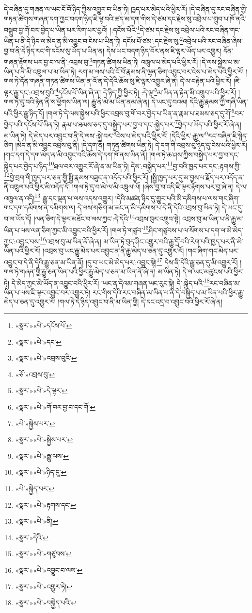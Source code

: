 དེ་བཞིན་དུ་གཞན་ལ་ཡང་ངོ་བོ་ཉིད་ཀྱིས་འགྱུར་བ་ཡིན་ཏེ། ཁྱད་པར་མེད་པའི་ཕྱིར་རོ། །དེ་བཞིན་དུ་རང་བཞིན་གྱི་གཏན་ཚིགས་གཞན་དག་ཀྱང་བདག་ཉིད་ཇི་ལྟ་བའི་ཚད་མ་དག་གིས་དེ་ཙམ་དང་རྗེས་སུ་འབྲེལ་པ་གྲུབ་པ་ཁོ་ནའི་བསྒྲུབ་བྱ་གོ་བར་བྱེད་པ་ཡིན་པར་རིག་པར་བྱའོ། །:དངོས་པོའི་\footnote{«སྣར་»«པེ་»དངོས་པོ་}དེ་ཙམ་དང་རྗེས་སུ་འབྲེལ་པའི་རང་བཞིན་གང་ཡིན་པ་ནི་དེ་ཉིད་ལ་མེད་ན་མི་འབྱུང་བ་ངེས་པ་ཡིན་ཏེ། དངོས་པོ་ཙམ་:དང་རྗེས་སུ་\footnote{«སྣར་»«པེ་»དང་}འབྲེལ་པའི་རང་བཞིན་ཞེས་བྱ་བ་ནི་དེ་ཉིད་རང་གི་དངོས་སུ་ཡོད་པ་ཡིན་ན། དེས་ཡང་བདག་ཉིད་བོར་ནས་ཇི་ལྟར་ཡོད་པར་འགྱུར། དོན་གཞན་རྟོགས་པར་བྱ་བ་ལ་ནི་:འབྲས་བུ་\footnote{«སྣར་»«པེ་»འབྲས་བུའི་}གཏན་ཚིགས་ཡིན་ཏེ། འཁྲུལ་པ་མེད་པའི་ཕྱིར་རོ། །དེ་ལས་སྐྱེས་པ་མ་ཡིན་པ་ནི་མི་འཁྲུལ་པ་མ་ཡིན་ཏེ། རག་མ་ལས་པའི་ངོ་བོ་རྣམས་ནི་ལྷན་ཅིག་འབྱུང་བར་ངེས་པ་མེད་པའི་ཕྱིར་རོ། །གལ་ཏེ་དོན་གཞན་གཏན་ཚིགས་ཡིན་ན་འོ་ན་དེ་དེའི་ཆོས་སུ་ཇི་ལྟར་འགྱུར་ཞེ་ན། དེ་ལ་བརྟེན་པའི་ཕྱིར་རོ། །ཇི་ལྟར་རྒྱུ་དང་:འབྲས་བུའི་\footnote{«ཅོ་»འབྲས་བུ་}དངོས་པོ་ཡིན་ཞེ་ན། དེ་ཉིད་ཀྱི་ཕྱིར་ཏེ། :དེ་ལྟ་\footnote{«སྣར་»«པེ་»དེ་ལྟར་}མ་ཡིན་ན་རྟེན་མི་འགྲུབ་པའི་ཕྱིར་རོ། །གལ་ཏེ་དུ་བའི་རྟེན་ནི་ས་ཕྱོགས་ཡིན་ལ། རྒྱུ་ནི་མེ་མ་ཡིན་ནམ་ཞེ་ན། དེ་ཡང་དུ་བའམ། དེའི་རྒྱུ་རྣམས་ཀྱི་གཞི་ཡིན་པའི་ཕྱིར་རྒྱུ་ཉིད་དོ། །གལ་ཏེ་དེ་ལས་སྐྱེས་པའི་ཕྱིར་འབྲས་བུ་གོ་བར་བྱེད་པ་ཡིན་ན་རྣམ་པ་ཐམས་ཅད་དུ་གོ་\footnote{«སྣར་»«པེ་»གོ་བར་བྱ་བ་དང་གོ་}བར་བྱེད་པའི་དངོས་པོ་ཡིན་ཏེ། རྣམ་པ་ཐམས་ཅད་དུ་བསྐྱེད་པར་བྱ་བ་དང་:སྐྱེད་པར་\footnote{«པེ་»སྐྱེས་པར་}བྱེད་པ་ཡོད་པའི་ཕྱིར་རོ་ཞེ་ན། མ་ཡིན་ཏེ། དེ་མེད་པར་འབྱུང་བ་ནི་དེ་ལས་:སྐྱེ་བར་\footnote{«སྣར་»«པེ་»སྐྱེས་པར་}ངེས་པ་མེད་པའི་ཕྱིར་རོ། །དེའི་ཕྱིར་:རྒྱུ་ལ་\footnote{«སྣར་»«པེ་»རྒྱུ་ལས་}རང་བཞིན་ཇི་སྙེད་ཅིག །མེད་ན་མི་འབྱུང་འབྲས་བུ་ནི། །དེ་དག་ནི། གཏན་ཚིགས་ཡིན་ཏེ། དེ་དག་གི་འབྲས་བུ་ཉིད་དུ་ངེས་པའི་ཕྱིར་རོ། །གང་དག་དེ་དག་མེད་ན་མི་འབྱུང་བའི་ཆོས་དེ་དག་ཁོ་ནས་ཡིན་ནོ། །གལ་ཏེ་ཆ་ཤས་ཀྱིས་བསྐྱེད་པར་བྱ་བ་དང་སྐྱེད་པར་བྱེད་པ་ཉིད་\footnote{«སྣར་»«པེ་»ཉིད་དུ་}ཐལ་བར་འགྱུར་རོ་ཞེ་ན་མ་ཡིན་ཏེ། དེས་:བསྐྱེད་པར་\footnote{«པེ་»སྐྱེད་པར་}བྱ་བའི་ཁྱད་པར་དང་:རྟགས་ཀྱི་\footnote{«སྣར་»«པེ་»རྟགས་དང་}བྱེ་བྲག་གི་ཁྱད་པར་ཅན་གྱི་སྤྱི་རྣམས་བཟུང་ན་འདོད་པའི་ཕྱིར་རོ། །སྤྱི་ཁྱད་པར་དུ་མ་བྱས་པ་རྗོད་པར་འདོད་ན་ནི་འཁྲུལ་པའི་ཕྱིར་མི་འདོད་དོ། །གལ་ཏེ་དུ་བ་མེ་ལ་མི་འཁྲུལ་ལོ། །ཞེས་བྱ་བ་འདི་ཇི་ལྟར་རྟོགས་པར་བྱ་ཞེ་ན། དེ་ལ་འཁྲུལ་ན་འདི།\footnote{«སྣར་»«པེ་»ནི།} རྒྱུ་དང་ལྡན་པ་ལས་འདས་འགྱུར། །དེའི་མཚན་ཉིད་དུ་གྱུར་པའི་མི་དམིགས་པ་ལས་གང་ཞིག་གང་དག་དམིགས་ན་དམིགས་ལ། དེ་ལས་གཅིག་མ་ཚང་ན་མི་དམིགས་པ་དེ་ནི་དེའི་འབྲས་བུ་ཡིན་ཏེ། དེ་ཡང་དུ་བ་ལ་ཡོད་དོ། །ལན་ཅིག་དེ་ལྟར་མཐོང་བ་ལས་ཀྱང་:དེ་དེའི་\footnote{«སྣར་»དེའི་}འབྲས་བུར་འགྲུབ་སྟེ། འབྲས་བུ་མ་ཡིན་པ་ནི་རྒྱུ་མ་ཡིན་པ་ལས་ལན་ཅིག་ཀྱང་མི་འབྱུང་བའི་ཕྱིར་རོ། །གལ་ཏེ་གཙུབ་\footnote{«སྣར་»«པེ་»གཙུབས་}ཤིང་གཙུབས་པ་ལ་སོགས་པ་དག་ལ་མེ་མེད་ཀྱང་:འབྱུང་བས་\footnote{«སྣར་»«པེ་»འབྱུང་བ་ལས་}འབྲས་བུ་མ་ཡིན་ནོ་ཞེ་ན། མ་ཡིན་ཏེ་བུད་ཤིང་འགྱུར་བའི་རྒྱུ་དྲོ་བའི་རེག་པའི་ཁྱད་པར་ནི་མེ་ཡིན་པའི་ཕྱིར་རོ། །འབྲས་བུ་ཡང་རྒྱུ་མེད་པར་འབྱུང་ན་ནི་རྒྱུ་མེད་པ་ཅན་དུ་འགྱུར་རོ། །གང་ཞིག་གང་མེད་པར་འབྱུང་བ་དེ་ནི་དེའི་རྒྱུ་ཅན་མ་ཡིན་ནོ། །དུ་བ་ཡང་མེ་མེད་པར་:འབྱུང་སྟེ།\footnote{«སྣར་»«པེ་»འགྱུར་ཏེ།} དེས་ནི་དེའི་རྒྱུ་ཅན་དུ་མི་འགྱུར་རོ། །གལ་ཏེ་གཞན་གྱི་རྒྱུ་ཅན་ཡིན་པའི་ཕྱིར་རྒྱུ་མེད་པ་ཅན་མ་ཡིན་ནོ་ཞེ་ན། མ་ཡིན་ཏེ། དེ་ལ་ཡང་མཚུངས་པའི་ཕྱིར་ཏེ། དེ་མེད་ཀྱང་མེ་ཡོད་ན་འབྱུང་བའི་ཕྱིར་རོ། །ཡང་ན་དེའམ་གཞན་ཡང་རུང་སྟེ། དེ་:སྐྱེད་པའི་\footnote{«སྣར་»«པེ་»བསྐྱེད་པའི་}རང་བཞིན་མ་ཡིན་པ་ལས་ཇི་ལྟར་འབྱུང་བར་འགྱུར་ཏེ། རང་གིས་དེའི་རང་བཞིན་མ་ཡིན་པ་ནི་དེ་བསྐྱེད་པ་མ་ཡིན་པའི་ཕྱིར་རྒྱུ་མེད་པ་ཅན་དུ་འགྱུར་རོ། །གལ་ཏེ་དེ་ཉིད་འབྱུང་བ་ནི་མ་ཡིན་གྱི། དེ་དང་འདྲ་བ་འབྱུང་བའི་ཕྱིར་རོ་ཞེ་ན། 